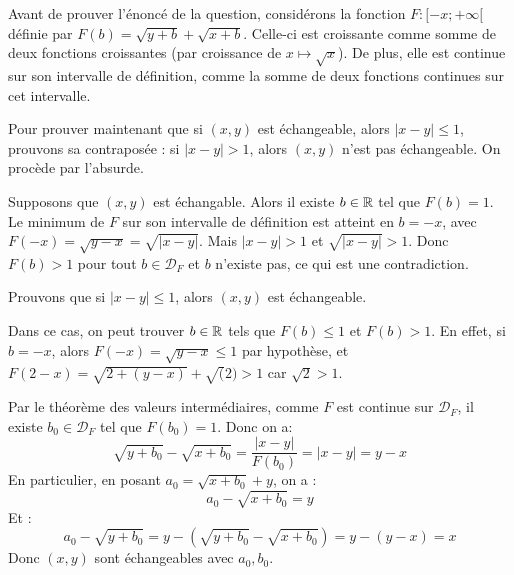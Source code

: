 \documentclass[]{../templates/homework}
\begin{document}
	Avant de prouver l'énoncé de la question, considérons la fonction $F: [-x;+\infty[$ définie par $F(b) = \sqrt{y+b} + \sqrt{x+b}$. Celle-ci est croissante comme somme de deux fonctions croissantes (par croissance de $x\mapsto \sqrt x$). De plus, elle est continue sur son intervalle de définition, comme la somme de deux fonctions continues sur cet intervalle.

	Pour prouver maintenant que si $(x,y)$ est échangeable, alors $|x-y| \leq 1$, prouvons sa contraposée : si $|x-y| > 1$, alors $(x,y)$ n'est pas échangeable. On procède par l'absurde.
	
	Supposons que $(x,y)$ est échangable. Alors il existe $b\in\mathbb R$ tel que $F(b) = 1$. Le minimum de $F$ sur son intervalle de définition est atteint en $b=-x$, avec $F(-x) = \sqrt{y-x} = \sqrt{|x-y|}$. Mais $|x-y| > 1$ et $\sqrt{|x-y|} > 1$. Donc $F(b) > 1$ pour tout $b\in \mathcal D_F$ et $b$ n'existe pas, ce qui est une contradiction.
	
	\subproblem
	Prouvons que si $|x-y| \leq 1$, alors $(x,y)$ est échangeable.
	
	Dans ce cas, on peut trouver $b\in\mathbb R$ tels que $F(b) \leq 1$ et $F(b) > 1$. En effet, si $b=-x$, alors $F(-x) = \sqrt{y-x} \leq 1$ par hypothèse, et $F(2-x) = \sqrt{2+(y-x)} + \sqrt(2) > 1$ car $\sqrt{2} > 1$.
	
	Par le théorème des valeurs intermédiaires, comme $F$ est continue sur $\mathcal D_F$, il existe $b_0 \in \mathcal D_F$ tel que $F(b_0) = 1$. Donc on a:
	\begin{equation*}
		\sqrt{y+b_0} - \sqrt{x+b_0} = \frac{|x-y|}{F(b_0)} = |x-y| = y-x
	\end{equation*}
	En particulier, en posant $a_0 = \sqrt{x+b_0} + y$, on a : $$a_0 - \sqrt{x+b_0} = y$$
	Et :$$a_0 - \sqrt{y+b_0} = y - (\sqrt{y+b_0} - \sqrt{x+b_0}) = y - (y-x) = x$$
	Donc $(x,y)$ sont échangeables avec $a_0, b_0$.
\end{document}
